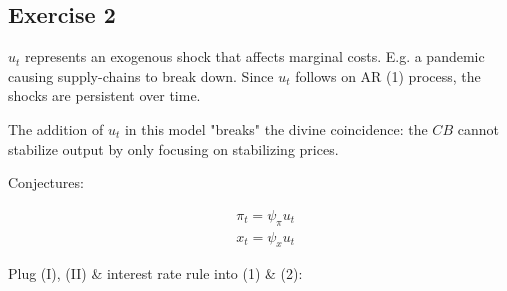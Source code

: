 {
\subsection*{Exercise 2}

\begin{enumerate}[label=(\alph*)]
{\item 
$u_t$ represents an exogenous shock that affects marginal costs. 
E.g. a pandemic causing supply-chains to break down. Since $u_{t}$ follows on AR (1) process, the shocks are persistent over time.

The addition of $u_{t}$ in this model "breaks" the divine coincidence: the $C B$ cannot stabilize output by only focusing on stabilizing prices.
}
{
\item 
Conjectures:

\begin{align}
    & \pi_{t}=\psi_{\pi} u_{t} \tag{I} \\
    & x_{t}=\psi_{x} u_{t} \tag{II}
\end{align}

Plug (I), (II) \& interest rate rule into (1) \& (2):

}
\end{enumerate}}
